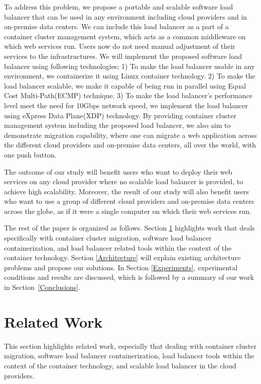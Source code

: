 To address this problem, we propose a portable and scalable software load balancer that can be used in any environment including cloud providers and in on-premise data centers.
We can include this load balancer as a part of a container cluster management system, which acts as a common middleware on which web services run.
Users now do not need manual adjustment of their services to the infrastructures.
We will implement the proposed software load balancer using following technologies;
1) To make the load balancer usable in any environment, we containerize it using Linux container technology\cite{menage2007adding}.
2) To make the load balancer scalable, we make it capable of being run in parallel using Equal Cost Multi-Path(ECMP) technique\cite{al2008scalable}.
3) To make the load balancer’s performance level meet the need for 10Gbps network speed, we implement the load balancer using eXpress Data Plane(XDP) technology\cite{bertin2017xdp}.
By providing container cluster management system including the proposed load balancer, we also aim to demonstrate migration capability, where one can migrate a web application across the different cloud providers and on-premise data centers, all over the world, with one push button.

The outcome of our study will benefit users who want to deploy their web services on any cloud provider where no scalable load balancer is provided, to achieve high scalability.
Moreover, the result of our study will also benefit users who want to use a group of different cloud providers and on-premise data centers across the globe, as if it were a single computer on which their web services run.

The rest of the paper is organized as follows.
Section \ref{Related Work} highlights work that deals specifically with container cluster migration, 
software load balancer containerization, and load balancer related tools within the context of the container technology. 
Section \ref{Architecture} will explain existing architecture problems and propose our solutions.
In Section \ref{Experiments}, experimental conditions and results are discussed,  
which is followed by a summary of our work in Section~\ref{Conclusions}.

\section{Related Work}\label{Related Work}

This section highlights related work, especially that dealing with container cluster migration, 
software load balancer containerization, load balancer tools within the context of the container technology, 
and scalable load balancer in the cloud providers.

